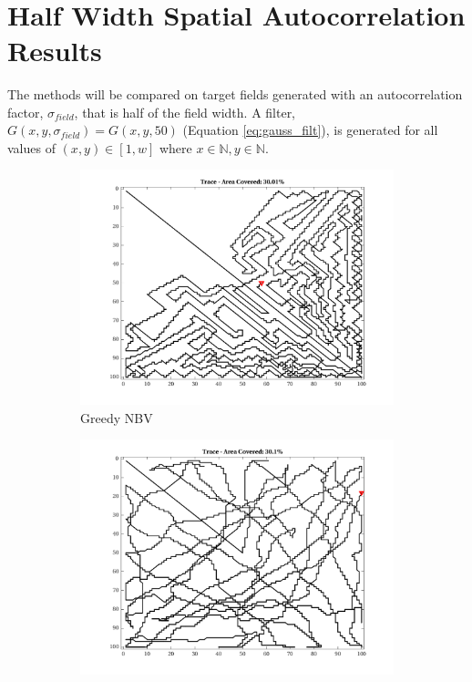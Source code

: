 \FloatBarrier
\clearpage\

\section{Half Width Spatial Autocorrelation Results}
The methods will be compared on target fields generated with an autocorrelation factor, $\sigma_{field}$, that is half of the field width. 
A filter, $G(x,y,\sigma_{field}) = G(x,y,50)$ (Equation \ref{eq:gauss_filt}), is generated for all values of $(x,y) \in [1, w]$ where $x \in \mathbb{N}, y \in \mathbb{N}$.

\begin{figure}[htb!]
    \centering
    \begin{subfigure}[t]{0.25\textwidth}
        \centering
        \includegraphics[width=\linewidth]{figures/path_greedy_30p_100x100_sf_50_seed_2.png}
        \captionsetup{skip=0.20\baselineskip,size=footnotesize}
        \caption{Greedy NBV}
    \end{subfigure}%
    \begin{subfigure}[t]{0.25\textwidth}
        \centering
        \includegraphics[width=\linewidth]{figures/path_mc_30p_100x100_sf_50_seed_2.png}

\end{subfigure}
\end{figure}
